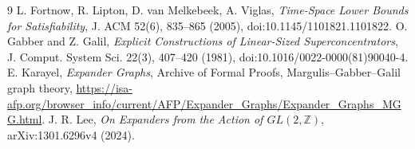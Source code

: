\documentclass[11pt]{article}
\begin{document}
\begin{thebibliography}{9}
 L. Fortnow, R. Lipton, D. van Melkebeek, A. Viglas, \emph{Time-Space Lower Bounds for Satisfiability}, J. ACM 52(6), 835--865 (2005), doi:10.1145/1101821.1101822.
 O. Gabber and Z. Galil, \emph{Explicit Constructions of Linear-Sized Superconcentrators}, J. Comput. System Sci. 22(3), 407--420 (1981), doi:10.1016/0022-0000(81)90040-4.
 E. Karayel, \emph{Expander Graphs}, Archive of Formal Proofs, Margulis--Gabber--Galil graph theory, \url{https://isa-afp.org/browser_info/current/AFP/Expander_Graphs/Expander_Graphs_MGG.html}.
 J. R. Lee, \emph{On Expanders from the Action of $GL(2,\mathbb Z)$}, arXiv:1301.6296v4 (2024).
\end{thebibliography}
\end{document}
